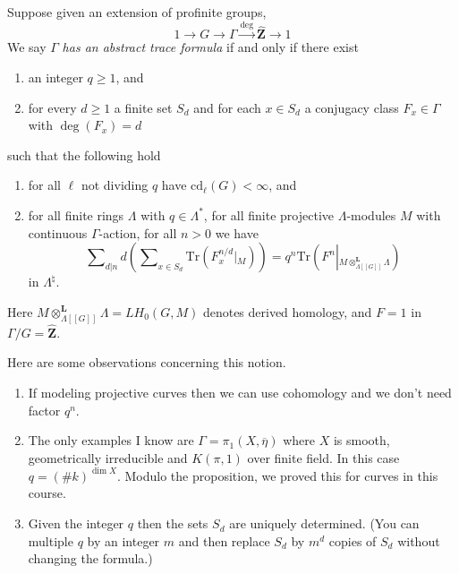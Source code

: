 \noindent
Suppose given an extension of profinite groups,
$$
1 \to G \to \Gamma \xrightarrow{\deg} \widehat{\mathbf{Z}} \to 1
$$
We say $\Gamma$ {\it has an abstract trace formula} if and only if
there exist
\begin{enumerate}
\item an integer $q\geq 1$, and
\item for every $d\geq 1$ a finite set $S_d$ and for each $x\in S_d$ a
conjugacy class $F_x \in \Gamma$ with $\deg(F_x) = d$
\end{enumerate}
such that the following hold
\begin{enumerate}
\item for all $\ell$ not dividing $q$ have $\text{cd}_\ell(G)<\infty$, and
\item for all finite rings $\Lambda$ with $q\in \Lambda^*$,
for all finite projective $\Lambda$-modules $M$ with continuous
$\Gamma$-action, for all $n>0$ we have
$$
\sum\nolimits_{d|n}d \left(
\sum\nolimits_{x \in S_d}
\text{Tr}( F_x^{n/d} \left|_M\right.)
\right)
=
q^n \text{Tr}( F^n\left|_{M \otimes_{\Lambda[[G]]}^{\mathbf{L}}\Lambda}\right.)
$$
in $\Lambda^\natural$.
\end{enumerate}
Here $M \otimes_{\Lambda[[G]]}^{\mathbf{L}}\Lambda = LH_0(G, M)$ denotes
derived homology, and $F=1$ in $\Gamma/G = \widehat{\mathbf{Z}}$.

\begin{remark}
\label{remark-abstract-trace-formula}
Here are some observations concerning this notion.
\begin{enumerate}
\item If modeling projective curves then we can use cohomology and we
don't need factor $q^n$.
\item The only examples I know are $\Gamma=\pi_1(X, \overline \eta)$
where $X$ is smooth, geometrically irreducible and $K(\pi, 1)$ over finite
field. In this case $q=(\# k)^{\dim X}$. Modulo the proposition, we proved
this for curves in this course.
\item Given the integer $q$ then the sets $S_d$ are uniquely
determined. (You can multiple $q$ by an integer $m$ and then replace $S_d$ by
$m^d$ copies of $S_d$ without changing the formula.)
\end{enumerate}
\end{remark}

